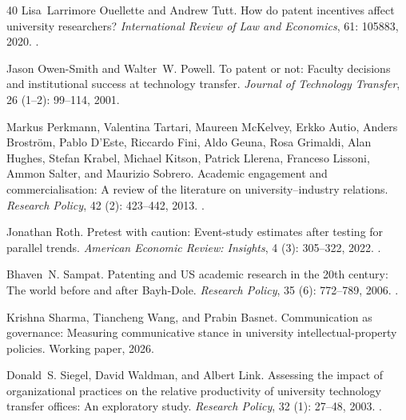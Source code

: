 \begin{thebibliography}{40}
Lisa~Larrimore Ouellette and Andrew Tutt.
\newblock How do patent incentives affect university researchers?
\newblock \emph{International Review of Law and Economics}, 61:
  105883, 2020.
\newblock {}.

Jason Owen-Smith and Walter~W. Powell.
\newblock To patent or not: Faculty decisions and institutional success at
  technology transfer.
\newblock \emph{Journal of Technology Transfer}, 26 (1--2):
  99--114, 2001.

Markus Perkmann, Valentina Tartari, Maureen McKelvey, Erkko Autio, Anders
  Brostr{\"o}m, Pablo D'Este, Riccardo Fini, Aldo Geuna, Rosa Grimaldi, Alan
  Hughes, Stefan Krabel, Michael Kitson, Patrick Llerena, Franceso Lissoni,
  Ammon Salter, and Maurizio Sobrero.
\newblock Academic engagement and commercialisation: A review of the literature
  on university--industry relations.
\newblock \emph{Research Policy}, 42 (2): 423--442, 2013.
\newblock {}.

Jonathan Roth.
\newblock Pretest with caution: Event-study estimates after testing for
  parallel trends.
\newblock \emph{American Economic Review: Insights}, 4 (3):
  305--322, 2022.
\newblock {}.

Bhaven~N. Sampat.
\newblock Patenting and {US} academic research in the 20th century: The world
  before and after {Bayh-Dole}.
\newblock \emph{Research Policy}, 35 (6): 772--789, 2006.
\newblock {}.

Krishna Sharma, Tiancheng Wang, and Prabin Basnet.
\newblock Communication as governance: Measuring communicative stance in
  university intellectual-property policies.
\newblock Working paper, 2026.

Donald~S. Siegel, David Waldman, and Albert Link.
\newblock Assessing the impact of organizational practices on the relative
  productivity of university technology transfer offices: An exploratory study.
\newblock \emph{Research Policy}, 32 (1): 27--48, 2003.
\newblock {}.


\end{thebibliography}
